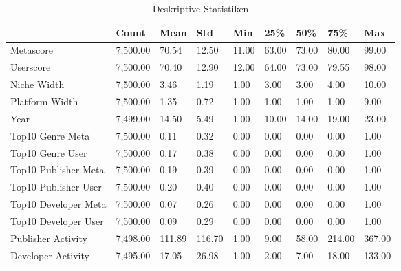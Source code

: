 \documentclass{article}
\begin{document}
\begin{table}[]
    \centering
    \caption*{Deskriptive Statistiken}
     \label{tab:my_label}
   \begin{tabular}{lllllllll}
\toprule
 {} &     Count &    Mean &     Std &    Min &    25\% &    50\% &     
  75\% &     Max \\
 \midrule
 Metascore           &  7,500.00 &   70.54 &   12.50 &  11.00 &   
 63.00 &  73.00 &   80.00 &   99.00 \\
 Userscore           &  7,500.00 &   70.40 &   12.90 &  12.00 &   
 64.00 &  73.00 &   79.55 &   98.00 \\
  Niche Width          &  7,500.00 &    3.46 &    1.19 &   1.00 &    
 3.00 &   3.00 &    4.00 &   10.00 \\
 Platform Width       &  7,500.00 &    1.35 &    0.72 &   1.00 &    
 1.00 &   1.00 &    1.00 &    9.00 \\
 Year                 &  7,499.00 &   14.50 &    5.49 &   1.00 &   
 10.00 &  14.00 &   19.00 &   23.00 \\
 Top10 Genre Meta     &  7,500.00 &    0.11 &    0.32 &   0.00 &    
 0.00 &   0.00 &    0.00 &    1.00 \\
 Top10 Genre User     &  7,500.00 &    0.17 &    0.38 &   0.00 &    
 0.00 &   0.00 &    0.00 &    1.00 \\
 Top10 Publisher Meta &  7,500.00 &    0.19 &    0.39 &   0.00 &    
 0.00 &   0.00 &    0.00 &    1.00 \\
 Top10 Publisher User &  7,500.00 &    0.20 &    0.40 &   0.00 &    
 0.00 &   0.00 &    0.00 &    1.00 \\
 Top10 Developer Meta &  7,500.00 &    0.07 &    0.26 &   0.00 &    
 0.00 &   0.00 &    0.00 &    1.00 \\
 Top10 Developer User &  7,500.00 &    0.09 &    0.29 &   0.00 &    
 0.00 &   0.00 &    0.00 &    1.00 \\
 Publisher Activity   &  7,498.00 &  111.89 &  116.70 &   1.00 &    
 9.00 &  58.00 &  214.00 &  367.00 \\
 Developer Activity   &  7,495.00 &   17.05 &   26.98 &   1.00 &    
 2.00 &   7.00 &   18.00 &  133.00 \\
 \bottomrule
 \end{tabular}

 \end{table}
\end{document}
